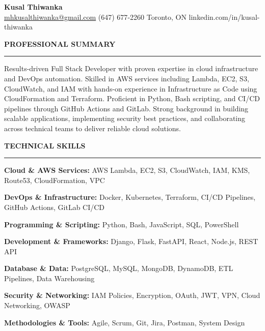 \documentclass[10pt,letterpaper]{article}
\begin{document}
\begin{center}
{\LARGE\textbf{Kusal Thiwanka}}\\[3pt]
\href{mailto:mhkusalthiwanka@gmail.com}{mhkusalthiwanka@gmail.com}\hspace{2em}%
(647) 677{-}2260\hspace{2em}%
Toronto, ON\hspace{2em}
linkedin.com/in/kusal-thiwanka
\end{center}

\vspace{6pt}

\textbf{PROFESSIONAL SUMMARY}\\[-8pt]
\noindent\rule{\textwidth}{1pt}

\vspace{-2pt}

Results-driven Full Stack Developer with proven expertise in cloud infrastructure and DevOps automation. Skilled in AWS services including Lambda, EC2, S3, CloudWatch, and IAM with hands-on experience in Infrastructure as Code using CloudFormation and Terraform. Proficient in Python, Bash scripting, and CI/CD pipelines through GitHub Actions and GitLab. Strong background in building scalable applications, implementing security best practices, and collaborating across technical teams to deliver reliable cloud solutions.

\vspace{8pt}

\textbf{TECHNICAL SKILLS}\\[-8pt]
\noindent\rule{\textwidth}{1pt}

\vspace{-2pt}

\textbf{Cloud \& AWS Services:} AWS Lambda, EC2, S3, CloudWatch, IAM, KMS, Route53, CloudFormation, VPC

\textbf{DevOps \& Infrastructure:} Docker, Kubernetes, Terraform, CI/CD Pipelines, GitHub Actions, GitLab CI/CD

\textbf{Programming \& Scripting:} Python, Bash, JavaScript, SQL, PowerShell

\textbf{Development \& Frameworks:} Django, Flask, FastAPI, React, Node.js, REST API

\textbf{Database \& Data:} PostgreSQL, MySQL, MongoDB, DynamoDB, ETL Pipelines, Data Warehousing

\textbf{Security \& Networking:} IAM Policies, Encryption, OAuth, JWT, VPN, Cloud Networking, OWASP

\textbf{Methodologies \& Tools:} Agile, Scrum, Git, Jira, Postman, System Design
\end{document}
